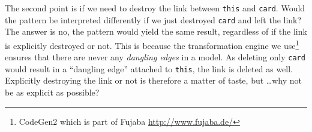 The second point is if we need to destroy the link between \texttt{this} and \texttt{card}.   Would the pattern be interpreted differently if we just destroyed
\texttt{card} and left the link?  The answer is no, the pattern would yield the same result, regardless of if the link is explicitly destroyed or not.
This is because the transformation engine we use\footnote{CodeGen2 which is part of Fujaba \url{http://www.fujaba.de/}} ensures that there are never any
 \emph{dangling edges} in a model.  As deleting only \texttt{card} would result in a ``dangling edge'' attached to \texttt{this}, the link
is deleted as well. Explicitly destroying the link or not is therefore a matter of taste, but \ldots why not be as explicit as possible?
